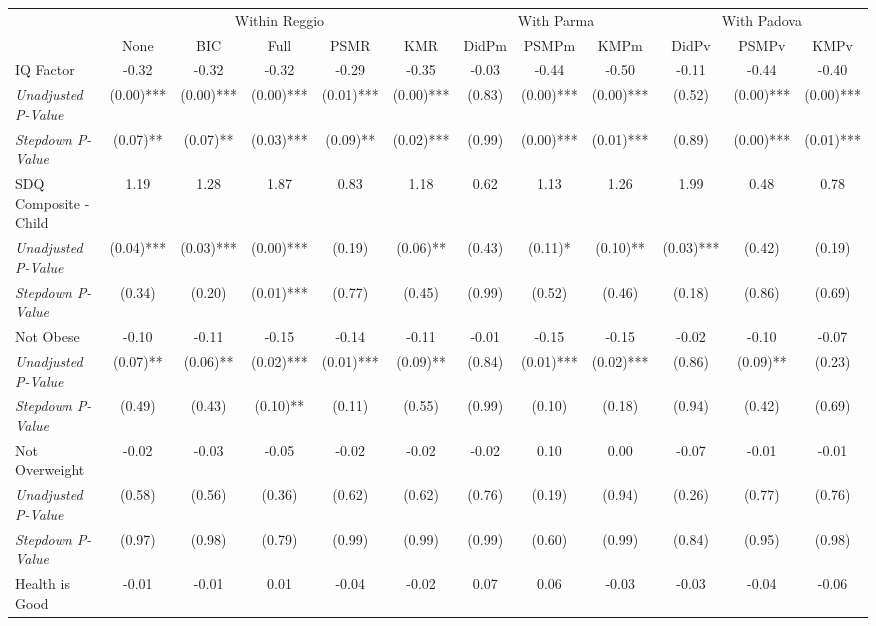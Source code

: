 \begin{tabular}{l c c c c c c c c c c c}
\toprule
& \multicolumn{5}{c}{Within Reggio} & \multicolumn{3}{c}{With Parma} & \multicolumn{3}{c}{With Padova} \\\cmidrule(lr){2-6} \cmidrule(lr){7-9} \cmidrule(lr){10-12}
 & None & BIC & Full & PSMR & KMR & DidPm & PSMPm & KMPm & DidPv & PSMPv & KMPv \\
\midrule
IQ Factor & -0.32 & -0.32 & -0.32 & -0.29 & -0.35 & -0.03 & -0.44 & -0.50 & -0.11 & -0.44 & -0.40 \\
\quad \textit{Unadjusted P-Value} & (0.00)*** & (0.00)*** & (0.00)*** & (0.01)*** & (0.00)*** & (0.83) & (0.00)*** & (0.00)*** & (0.52) & (0.00)*** & (0.00)*** \\
\quad \textit{Stepdown P-Value} & (0.07)** & (0.07)** & (0.03)*** & (0.09)** & (0.02)*** & (0.99) & (0.00)*** & (0.01)*** & (0.89) & (0.00)*** & (0.01)*** \\
SDQ Composite - Child & 1.19 & 1.28 & 1.87 & 0.83 & 1.18 & 0.62 & 1.13 & 1.26 & 1.99 & 0.48 & 0.78 \\
\quad \textit{Unadjusted P-Value} & (0.04)*** & (0.03)*** & (0.00)*** & (0.19) & (0.06)** & (0.43) & (0.11)* & (0.10)** & (0.03)*** & (0.42) & (0.19) \\
\quad \textit{Stepdown P-Value} & (0.34) & (0.20) & (0.01)*** & (0.77) & (0.45) & (0.99) & (0.52) & (0.46) & (0.18) & (0.86) & (0.69) \\
Not Obese & -0.10 & -0.11 & -0.15 & -0.14 & -0.11 & -0.01 & -0.15 & -0.15 & -0.02 & -0.10 & -0.07 \\
\quad \textit{Unadjusted P-Value} & (0.07)** & (0.06)** & (0.02)*** & (0.01)*** & (0.09)** & (0.84) & (0.01)*** & (0.02)*** & (0.86) & (0.09)** & (0.23) \\
\quad \textit{Stepdown P-Value} & (0.49) & (0.43) & (0.10)** & (0.11) & (0.55) & (0.99) & (0.10) & (0.18) & (0.94) & (0.42) & (0.69) \\
Not Overweight & -0.02 & -0.03 & -0.05 & -0.02 & -0.02 & -0.02 & 0.10 & 0.00 & -0.07 & -0.01 & -0.01 \\
\quad \textit{Unadjusted P-Value} & (0.58) & (0.56) & (0.36) & (0.62) & (0.62) & (0.76) & (0.19) & (0.94) & (0.26) & (0.77) & (0.76) \\
\quad \textit{Stepdown P-Value} & (0.97) & (0.98) & (0.79) & (0.99) & (0.99) & (0.99) & (0.60) & (0.99) & (0.84) & (0.95) & (0.98) \\
Health is Good & -0.01 & -0.01 & 0.01 & -0.04 & -0.02 & 0.07 & 0.06 & -0.03 & -0.03 & -0.04 & -0.06 \\

\end{tabular}
